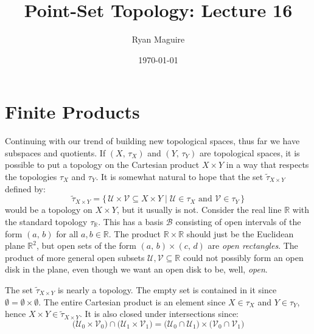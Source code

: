 \documentclass{article}
\title{Point-Set Topology: Lecture 16}
\author{Ryan Maguire}
\date{\today}
\theoremstyle{plain}
\theoremstyle{normal}
\begin{document}
    \maketitle
    \section{Finite Products}
        Continuing with our trend of building new topological spaces, thus far
        we have subspaces and quotients. If $(X,\,\tau_{X})$ and
        $(Y,\,\tau_{Y})$ are topological spaces, it is possible to put a
        topology on the Cartesian product $X\times{Y}$ in a way that respects
        the topologies $\tau_{X}$ and $\tau_{Y}$. It is somewhat natural to hope
        that the set $\tilde{\tau}_{X\times{Y}}$ defined by:
        \begin{equation}
            \tilde{\tau}_{X\times{Y}}=
            \{\,\mathcal{U}\times\mathcal{V}\subseteq{X}\times{Y}\;|\;
                \mathcal{U}\in\tau_{X}\textrm{ and }\mathcal{V}\in\tau_{Y}\,\}
        \end{equation}
        would be a topology on $X\times{Y}$, but it usually is not. Consider the
        real line $\mathbb{R}$ with the standard topology $\tau_{\mathbb{R}}$.
        This has a basis $\mathcal{B}$ consisting of open intervals of the
        form $(a,\,b)$ for all $a,b\in\mathbb{R}$. The product
        $\mathbb{R}\times\mathbb{R}$ should just be the Euclidean plane
        $\mathbb{R}^{2}$, but open sets of the form $(a,\,b)\times(c,\,d)$ are
        \textit{open rectangles}. The product of more general open subsets
        $\mathcal{U},\mathcal{V}\subseteq\mathbb{R}$ could not possibly form an
        open disk in the plane, even though we want an open disk to be, well,
        \textit{open}.
        \par\hfill\par
        The set $\tilde{\tau}_{X\times{Y}}$ is
        nearly a topology. The empty set is contained in it since
        $\emptyset=\emptyset\times\emptyset$. The entire Cartesian product is
        an element since $X\in\tau_{X}$ and $Y\in\tau_{Y}$, hence
        $X\times{Y}\in\tilde{\tau}_{X\times{Y}}$. It is also closed under
        intersections since:
        \begin{equation}
            \big(\mathcal{U}_{0}\times\mathcal{V}_{0}\big)\cap
            \big(\mathcal{U}_{1}\times\mathcal{V}_{1}\big)
            =\big(\mathcal{U}_{0}\cap\mathcal{U}_{1}\big)\times
            \big(\mathcal{V}_{0}\cap\mathcal{V}_{1}\big)
        \end{equation}
\end{document}
